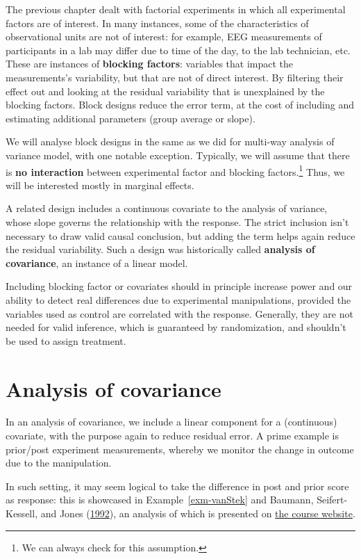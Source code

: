 \documentclass[
  11pt,
  letterpaper,
]{scrbook}
\theoremstyle{definition}
\theoremstyle{remark}
\begin{document}
The previous chapter dealt with factorial experiments in which all
experimental factors are of interest. In many instances, some of the
characteristics of observational units are not of interest: for example,
EEG measurements of participants in a lab may differ due to time of the
day, to the lab technician, etc. These are instances of \textbf{blocking
factors}: variables that impact the measurements's variability, but that
are not of direct interest. By filtering their effect out and looking at
the residual variability that is unexplained by the blocking factors.
Block designs reduce the error term, at the cost of including and
estimating additional parameters (group average or slope).

We will analyse block designs in the same as we did for multi-way
analysis of variance model, with one notable exception. Typically, we
will assume that there is \textbf{no interaction} between experimental
factor and blocking factors.\footnote{We can always check for this
  assumption.} Thus, we will be interested mostly in marginal effects.

A related design includes a continuous covariate to the analysis of
variance, whose slope governs the relationship with the response. The
strict inclusion isn't necessary to draw valid causal conclusion, but
adding the term helps again reduce the residual variability. Such a
design was historically called \textbf{analysis of covariance}, an
instance of a linear model.

Including blocking factor or covariates should in principle increase
power and our ability to detect real differences due to experimental
manipulations, provided the variables used as control are correlated
with the response. Generally, they are not needed for valid inference,
which is guaranteed by randomization, and shouldn't be used to assign
treatment.

\hypertarget{ancova}{%
\section{Analysis of covariance}\label{ancova}}

In an analysis of covariance, we include a linear component for a
(continuous) covariate, with the purpose again to reduce residual error.
A prime example is prior/post experiment measurements, whereby we
monitor the change in outcome due to the manipulation.

In such setting, it may seem logical to take the difference in post and
prior score as response: this is showcased in Example~\ref{exm-vanStek}
and Baumann, Seifert-Kessell, and Jones
(\protect\hyperlink{ref-Baumann:1992}{1992}), an analysis of which is
presented on \href{https://edsm.rbind.io/example/06-ancova/}{the course
website}.
\end{document}
